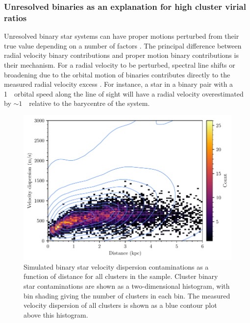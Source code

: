\subsubsection{Unresolved binaries as an explanation for high cluster virial ratios}

Unresolved binary star systems can have proper motions perturbed from their true value depending on a number of factors \citep{penoyre_binary_2020}. The principal difference between radial velocity binary contributions and proper motion binary contributions is their mechanism. For a radial velocity to be perturbed, spectral line shifts or broadening due to the orbital motion of binaries contributes directly to the measured radial velocity excess \citep{gieles_velocity_2010}. For instance, a star in a binary pair with a 1~\kms\ orbital speed along the line of sight will have a radial velocity overestimated by $\sim1$~\kms\ relative to the barycentre of the system.

\begin{figure}[t]
    \centering
    \includegraphics[width=\textwidth]{fig/c4/dispersion_binaries.pdf}
    \caption[Simulated binary star velocity dispersion contaminations as a function of distance for all clusters in the sample]{Simulated binary star velocity dispersion contaminations as a function of distance for all clusters in the sample. Cluster binary star contaminations are shown as a two-dimensional histogram, with bin shading giving the number of clusters in each bin. The measured velocity dispersion of all clusters is shown as a blue contour plot above this histogram.}
    \label{fig:dynamics:velocities:binary_contamination}
\end{figure}

